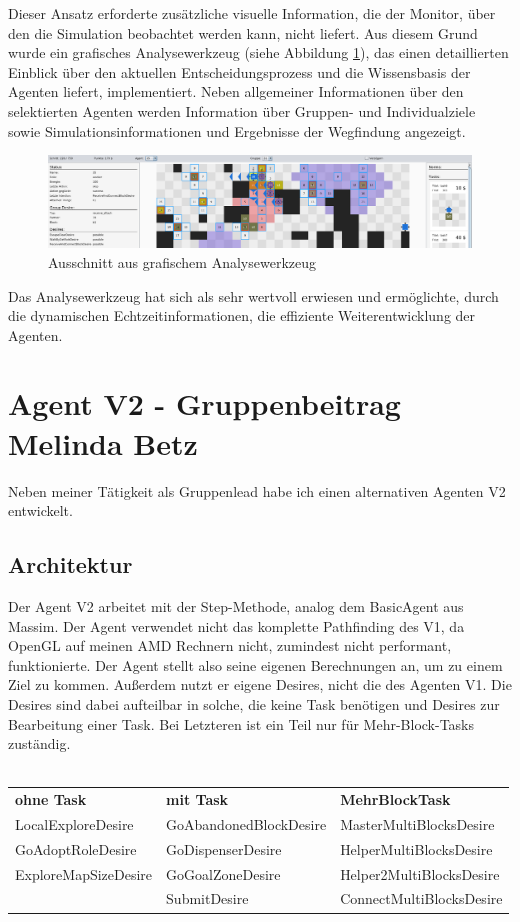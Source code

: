 \documentclass[runningheads]{llncs}
\begin{document}
	Dieser Ansatz erforderte zusätzliche visuelle Information, die der Monitor, über den die Simulation beobachtet werden kann, nicht liefert. Aus diesem Grund wurde ein grafisches Analysewerkzeug (siehe Abbildung \ref{debugger}), das einen detaillierten Einblick über den aktuellen Entscheidungsprozess und die Wissensbasis der Agenten liefert, implementiert. Neben allgemeiner Informationen über den selektierten Agenten werden Information über Gruppen- und Individualziele sowie Simulationsinformationen und Ergebnisse der Wegfindung angezeigt.
	
	
	\begin{figure}
		\vspace{-3mm}
		\includegraphics[scale=0.091]{./Referenzen/Debugger3.png}
		\caption{Ausschnitt aus grafischem Analysewerkzeug}
		\label{debugger}
		\vspace{-3mm}
	\end{figure}
	
	Das Analysewerkzeug hat sich als sehr wertvoll erwiesen und ermöglichte, durch die dynamischen Echtzeitinformationen, die effiziente Weiterentwicklung der Agenten.
	
	
	\section{Agent V2 - Gruppenbeitrag Melinda Betz}\label{agentV2}
	Neben meiner Tätigkeit als Gruppenlead habe ich einen alternativen Agenten V2 entwickelt.
	
	\subsection{ Architektur}
	Der Agent V2 arbeitet mit der Step-Methode, analog dem BasicAgent aus Massim. 
	Der Agent verwendet nicht das komplette Pathfinding des V1, da OpenGL auf meinen AMD Rechnern nicht, zumindest nicht performant, funktionierte. Der Agent stellt also seine eigenen Berechnungen an, um zu einem Ziel zu kommen. Außerdem nutzt er eigene Desires, nicht die des Agenten V1. Die Desires sind dabei aufteilbar in solche, die keine Task benötigen und Desires zur Bearbeitung einer Task. Bei Letzteren ist ein Teil nur für Mehr-Block-Tasks zuständig.
	\\
	\\
	\begin{tabular}{lll}
	\textbf{ohne Task} & \textbf{mit Task} & \textbf{Mehr\-Block\-Task}\\
	LocalExploreDesire & GoAbandonedBlockDesire & MasterMultiBlocksDesire\\
	GoAdoptRoleDesire & GoDispenserDesire & HelperMultiBlocksDesire\\
	ExploreMapSizeDesire & GoGoalZoneDesire & Helper2MultiBlocksDesire\\
	& SubmitDesire & ConnectMultiBlocksDesire\\
	\end{tabular}
	
\end{document}
